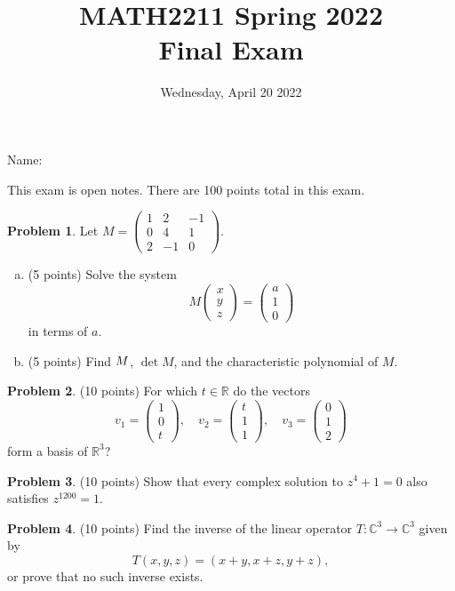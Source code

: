 \documentclass[11pt,oneside]{amsart}
\title{MATH2211 Spring 2022\\
Final Exam}
\author{Wednesday, April 20 2022}
\theoremstyle{definition}
\newtheorem{problem}{Problem}
\newcommand{\bC}{\mathbb{C}}
\newcommand{\bF}{\mathbb{F}}
\newcommand{\bR}{\mathbb{R}}
\newcommand*\dcolvec[1]{\begin{pmatrix}#1\end{pmatrix}}
\let\tr\relax
\DeclareMathOperator{\tr}{tr}
\begin{document}
    \maketitle

    Name: \underline{\hspace{6cm}}

    This exam is open notes. There are 100 points total in this exam.

    \begin{problem}
        Let $M=\begin{pmatrix}
            1&2&-1\\
            0&4&1\\
            2&-1&0
        \end{pmatrix}$.
        \begin{enumerate}[(a)]
            \item (5 points) Solve the system
            \[M\begin{pmatrix}
                x\\y\\z
            \end{pmatrix}=\begin{pmatrix}
                a\\1\\0
            \end{pmatrix}\]
            in terms of $a$.
            \vfill
            \item (5 points) Find $\tr M$, $\det M$, and the characteristic polynomial of $M$.
            \vfill
        \end{enumerate}
    \end{problem}
    \newpage
    \begin{problem}
        (10 points) For which $t\in\bR$ do the vectors
        \[v_1=\dcolvec{1\\0\\t},\quad v_2=\dcolvec{t\\1\\1}, \quad v_3=\dcolvec{0\\1\\2}\]
        form a basis of $\bR^3$?
    \end{problem}
    \vfill
    \begin{problem}
        (10 points) Show that every complex solution to $z^4+1=0$ also satisfies $z^{1200}=1$.
    \end{problem}
    \vfill
    \newpage
    \begin{problem}

        (10 points) Find the inverse of the linear operator $T\colon \bC^3\to\bC^3$ given by
        \[T(x,y,z)=(x+y,x+z,y+z),\]
        or prove that no such inverse exists.
    \end{problem}
\end{document}
